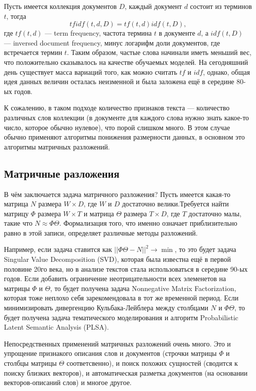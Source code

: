 \documentclass[a4paper,14pt]{extarticle}
\begin{document}
Пусть имеется коллекция документов $D$, каждый документ $d$ состоит из терминов $t$, тогда 
\[
tfidf(t, d, D) = tf(t, d) idf(t, D),
\]
где $tf(t, d)$ --- term frequency, частота термина $t$ в документе $d$, а $idf(t, D)$ --- inversed document frequency, минус логарифм доли документов, где встречается термин $t$. Таким образом, частые слова начинали иметь меньший вес, что положительно сказывалось на качестве обучаемых моделей. На сегодняшний день существует масса вариаций того,  как можно считать $tf$ и $idf$, однако, общая идея данных величин осталась неизменной и была заложена ещё в середине 80-ых годов.

К сожалению, в таком подходе количество признаков текста --- количество различных слов коллекции (в документе для каждого слова нужно знать какое-то число, которое обычно нулевое), что порой слишком много. В этом случае обычно применяют алгоритмы понижения размерности данных, в основном это алгоритмы матричных разложений.
\subsection{Матричные разложения}
В чём заключается задача матричного разложения? Пусть имеется какая-то матрица $N$ размера $W \times D$, где $W$ и $D$ достаточно велики.Требуется найти матрицу $\Phi$ размера $W \times T$ и матрица $\Theta$  размера $T \times D$, где $T$ достаточно малы, такие что $N \approx \Phi \Theta$. Формализация того, что именно означает приблизительно равно в этой записи, определяет различные методы разложений.

Например, если задача ставится как $||\Phi \Theta - N||^2 \to \min$, то это будет задача Singular Value Decomposition (SVD), которая была известна ещё в первой половине 20го века, но в анализе текстов стала использоваться в середине 90-ых годов. Если добавить ограничение неотрицательности всех элеменетов на матрицы $\Phi$ и $\Theta$, то будет получена задача Nonnegative Matrix Factorization, которая тоже неплохо себя зарекомендовала в тот же временной период. Если минимизировать дивергенцию Кульбака-Лейблера между столбцами $N$ и $\Phi\Theta$, то будет получена задача тематического моделирования и алгоритм Probabilistic Latent Semantic Analysis (PLSA).

Непосредственных применений матричных разложений очень много. Это и упрощение признакого описания слов и документов (строчки матрицы $\Phi$ и столбцы матрицы $\Theta$ соответсвенно), и поиск похожих сущностей (сводится к поиску близких векторов), и автоматическая разметка документов (на основании векторов-описаний слов) и многое другое.
\end{document}
